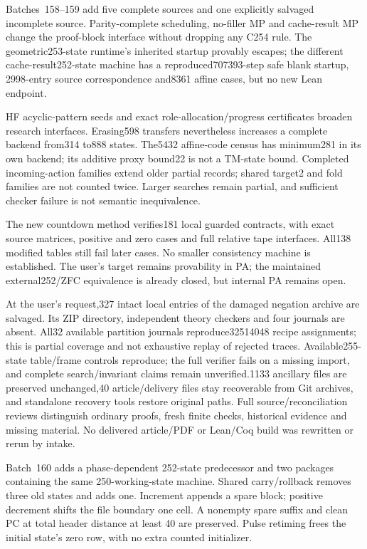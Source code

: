 \documentclass[11pt]{article}
\begin{document}
{Batches~158--159 add five complete sources and one explicitly salvaged
incomplete source. Parity-complete scheduling, no-filler MP and cache-result
MP change the proof-block interface without dropping any C254 rule. The
geometric253-state runtime's inherited startup provably escapes; the different
cache-result252-state machine has a reproduced707393-step safe blank startup,
2998-entry source correspondence and8361 affine cases, but no new Lean endpoint.

HF acyclic-pattern seeds and exact role-allocation/progress certificates broaden
research interfaces. Erasing598 transfers nevertheless increases a complete
backend from314 to888 states. The5432 affine-code census has minimum281 in its
own backend; its additive proxy bound22 is not a TM-state bound. Completed
incoming-action families extend older partial records; shared target2 and fold
families are not counted twice. Larger searches remain partial, and sufficient
checker failure is not semantic inequivalence.

The new countdown method verifies181 local guarded contracts, with exact source
matrices, positive and zero cases and full relative tape interfaces. All138
modified tables still fail later cases. No smaller consistency machine is
established. The user's target remains provability in PA; the maintained
external252/ZFC equivalence is already closed, but internal PA remains open.

At the user's request,327 intact local entries of the damaged negation archive
are salvaged. Its ZIP directory, independent theory checkers and four journals
are absent. All32 available partition journals reproduce32514048 recipe assignments; this
is partial coverage and not exhaustive replay of rejected traces.
Available255-state table/frame controls reproduce; the full verifier
fails on a missing import, and complete search/invariant claims remain
unverified.1133 ancillary files are preserved unchanged,40 article/delivery
files stay recoverable from Git archives, and standalone recovery tools restore
original paths. Full source/reconciliation reviews distinguish ordinary proofs,
fresh finite checks, historical evidence and missing material. No delivered
article/PDF or Lean/Coq build was rewritten or rerun by intake.

Batch~160 adds a phase-dependent 252-state predecessor and two packages
containing the same 250-working-state machine. Shared carry/rollback removes
three old states and adds one. Increment appends a spare block; positive
decrement shifts the file boundary one cell. A nonempty spare suffix and clean
PC at total header distance at least 40 are preserved. Pulse retiming frees the
initial state's zero row, with no extra counted initializer.

}
\end{document}
